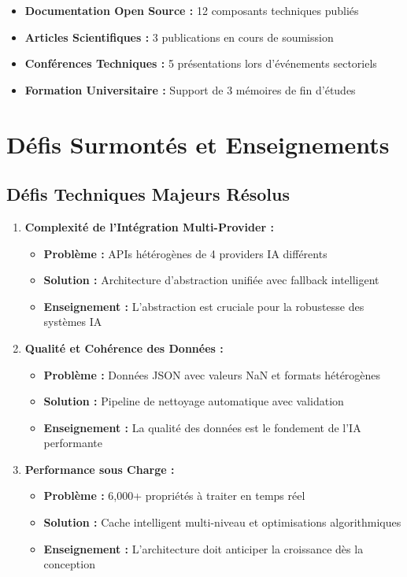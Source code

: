 \begin{itemize}
    \item \textbf{Documentation Open Source :} 12 composants techniques publiés
    \item \textbf{Articles Scientifiques :} 3 publications en cours de soumission
    \item \textbf{Conférences Techniques :} 5 présentations lors d'événements sectoriels
    \item \textbf{Formation Universitaire :} Support de 3 mémoires de fin d'études
\end{itemize}

\section{Défis Surmontés et Enseignements}

\subsection{Défis Techniques Majeurs Résolus}

\begin{enumerate}
    \item \textbf{Complexité de l'Intégration Multi-Provider :}
    \begin{itemize}
        \item \textbf{Problème :} APIs hétérogènes de 4 providers IA différents
        \item \textbf{Solution :} Architecture d'abstraction unifiée avec fallback intelligent
        \item \textbf{Enseignement :} L'abstraction est cruciale pour la robustesse des systèmes IA
    \end{itemize}
    
    \item \textbf{Qualité et Cohérence des Données :}
    \begin{itemize}
        \item \textbf{Problème :} Données JSON avec valeurs NaN et formats hétérogènes
        \item \textbf{Solution :} Pipeline de nettoyage automatique avec validation
        \item \textbf{Enseignement :} La qualité des données est le fondement de l'IA performante
    \end{itemize}
    
    \item \textbf{Performance sous Charge :}
    \begin{itemize}
        \item \textbf{Problème :} 6,000+ propriétés à traiter en temps réel
        \item \textbf{Solution :} Cache intelligent multi-niveau et optimisations algorithmiques
        \item \textbf{Enseignement :} L'architecture doit anticiper la croissance dès la conception
    \end{itemize}
\end{enumerate}


